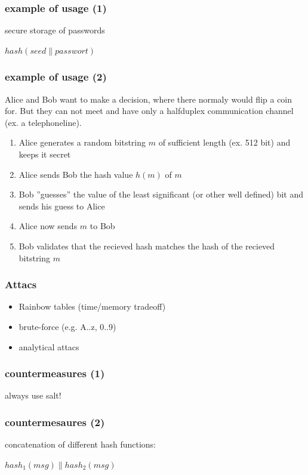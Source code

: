\begin{frame}
\frametitle{example of usage (1)}
	secure storage of passwords
	\par
	\begin{center}$hash( seed \parallel passwort )$\end{center}
\end{frame}

\begin{frame}
	\frametitle{example of usage (2)}
	Alice and Bob want to make a decision, where there normaly would flip a coin for.
	But they can not meet and have only a halfduplex communication channel (ex. a telephoneline).
	\begin{enumerate}
		\item Alice generates a random bitstring $m$ of sufficient length (ex. 512 bit) and keeps it secret
		\item Alice sends Bob the hash value $h(m)$ of $m$
		\item Bob ''guesses'' the value of the least significant (or other well defined) bit and sends his guess to Alice
		\item Alice now sends $m$ to Bob
		\item Bob validates that the recieved hash matches the hash of the recieved bitstring $m$
	\end{enumerate}	
\end{frame}

\begin{frame}
\frametitle{Attacs}
	\begin{itemize}
		\item Rainbow tables (time/memory tradeoff)
		\item brute-force (e.g. A..z, 0..9)
		\item analytical attacs
	\end{itemize}
\end{frame}

\begin{frame}
\frametitle{countermeasures (1)}
	\large{always use salt!}
\end{frame}

\begin{frame}
\frametitle{countermesaures (2)}
	concatenation of different hash functions:
	\par
	\begin{center}$hash_1 (msg) \parallel hash_2(msg)$\end{center}
\end{frame}

